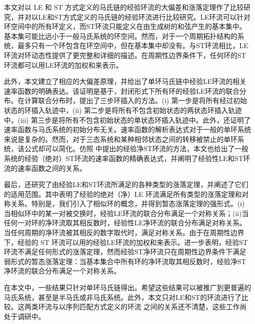 本文对以 LE 和 ST 方式定义的马氏链的经验环流的大偏差和涨落定理作了比较研究，并对以LE和ST方式定义的马氏链的经验环流进行比较研究。LE环流可以针对环空间中的所有环定义，而ST环流只能定义在由生成树的和弦产生的基本集中。基本集可能比远小于一般马氏系统的环空间。然而，对于一个周期拓扑结构的系统，最多只有一个环包含在环空间中，但在基本集中却没有。与ST环流相比，LE环流对环动态性提供了更完整和详细的描述。在周期性边界条件下，任何环的ST环流都可以用LE环流的加权和来表示。

此外，本文建立了相应的大偏差原理，并给出了单环马氏链中经验LE环流的相关速率函数的明确表达。该证明是基于，封闭形式下所有环的经验LE环流的联合分布。在计算联合分布时，提出了三步环插入的方法。(i) 第一步是将所有经过初始状态的环插入轨迹中，(ii) 第二步是将所有不包含初始状态的两状态环插入轨迹中，(iii) 第三步是将所有不包含初始状态的单状态环插入轨迹中。此外，还证明了速率函数与马氏系统的初始分布无关。速率函数的解析表达式对于一般的单环系统来说是复杂的。然而，对于三态系统和某种相邻状态之间的转移被禁止的单环系统，该公式却可以简化。仿照 \cite{bertini2015flows} 中提出的经验净ST环流的方法，本文也给出了一般系统的经验（绝对）ST环流的速率函数的精确表达式，并阐明了经验性LE和ST环流的速率函数之间的关系。

最后，还研究了由经验LE和ST环流所满足的各种类型的涨落定理，并阐述了它们的适用范围。其中表明了经验的绝对（净）LE 环流满足所有类型的涨落定理和对称关系。特别是，我们引入了相似环的概念，并得到暂态涨落定理的强形式。(i) 当相似环中的某一对被交换时，经验LE环流的联合分布满足一个对称关系；(ii)当任何一对环的净环流取其相反数时，经验性LE净环流的联合分布满足对称关系。当任何周期的净环流被其相反的数字取代时，满足对称关系。由于在周期性边界下，经验的 ST 环流可以用的经验LE环流的加权和来表示。进一步表明，经验ST环流不满足任何形式的涨落定理，然而经验ST净环流只在周期性边界条件下满足弱形式的暂态涨落定理：当基本集合中所有环的净环流取其相反数时，经验净ST净环流的联合分布满足一个对称关系。

在本文中，一些结果只针对单环马氏链得出。希望这些结果可以被推广到更普遍的马氏系统，甚至是半马氏或非马氏系统。此外，本文只对LE和ST的环流进行了比较。这两类环流与以序列匹配方式定义的环流 \cite{roldan2019exact,biddle2020reversal,pietzonka2021cycle} 之间的关系还不清楚，这些工作尚处于调研中。